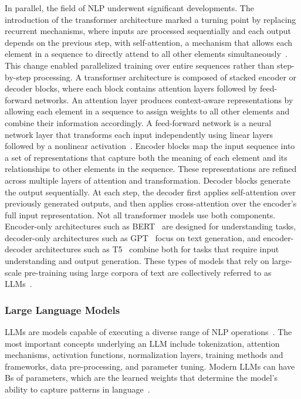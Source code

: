 \documentclass[
english,                 %
bibtex,                  %
]{kththesis}
\numberwithin{listing}{chapter}
\begin{document}
In parallel, the field of \gls{NLP} underwent significant developments. The introduction of the transformer architecture marked a turning point by replacing recurrent mechanisms, where inputs are processed sequentially and each output depends on the previous step, with self-attention, a mechanism that allows each element in a sequence to directly attend to all other elements simultaneously~\cite{vaswani_attention_2017}. This change enabled parallelized training over entire sequences rather than step-by-step processing. A transformer architecture is composed of stacked encoder or decoder blocks, where each block contains attention layers followed by feed-forward networks. An attention layer produces context-aware representations by allowing each element in a sequence to assign weights to all other elements and combine their information accordingly. A feed-forward network is a neural network layer that transforms each input independently using linear layers followed by a nonlinear activation~\cite{huang_da-code_2024}. Encoder blocks map the input sequence into a set of representations that capture both the meaning of each element and its relationships to other elements in the sequence. These representations are refined across multiple layers of attention and transformation. Decoder blocks generate the output sequentially. At each step, the decoder first applies self-attention over previously generated outputs, and then applies cross-attention over the encoder’s full input representation. Not all transformer models use both components. Encoder-only architectures such as \gls{BERT}~\cite{devlin_bert_2019} are designed for understanding tasks, decoder-only architectures such as \gls{GPT}~\cite{radford_improving_2018} focus on text generation, and encoder-decoder architectures such as T5~\cite{raffel_exploring_2023} combine both for tasks that require input understanding and output generation. These types of models that rely on large-scale pre-training using large corpora of text are collectively referred to as \glspl{LLM}~\cite{bandi_power_2023}.

\subsubsection{Large Language Models}
\label{sec:bg_llm}

\Glspl{LLM} are models capable of executing a diverse range of \gls{NLP} operations~\cite{raiaan_review_2024}. The most important concepts underlying an \gls{LLM} include tokenization, attention mechanisms, activation functions, normalization layers, training methods and frameworks, data pre-processing, and parameter tuning. Modern \glspl{LLM} can have \glspl{B} of parameters, which are the learned weights that determine the model’s ability to capture patterns in language~\cite{brown_language_2020}.
\end{document}
